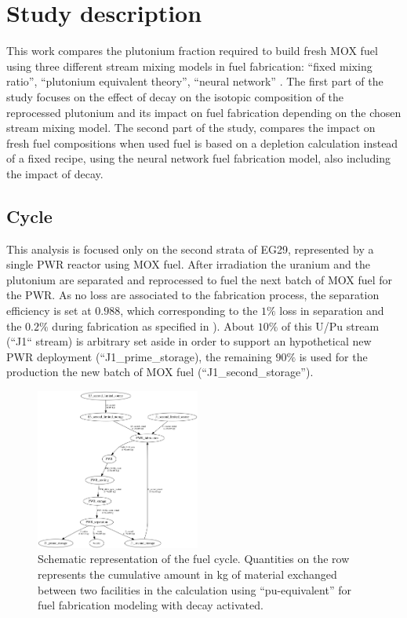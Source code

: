 \documentclass{anstrans}
\begin{document}
\section{Study description}

This work compares the plutonium fraction required to build fresh MOX fuel
using three different stream mixing models in fuel fabrication: ``fixed mixing
ratio'', ``plutonium equivalent theory'', ``neural network'' \cite{Leniau2015125}.
The first part of the study focuses on the effect of decay on the isotopic
composition of the reprocessed plutonium and its impact on fuel fabrication
depending on the chosen stream mixing model.  The second part of the study,
compares the impact on fresh fuel compositions when used fuel is based on a
depletion calculation instead of a fixed recipe, using the neural network fuel
fabrication model, also including the impact of decay.


\subsection{Cycle}

This analysis is focused only on the second strata of EG29, represented by a
single PWR reactor using MOX fuel. After irradiation the uranium and the
plutonium are separated and reprocessed to fuel the next batch of MOX fuel for
the PWR. As no loss are associated to the fabrication process, the separation
efficiency is set at $0.988$, which corresponding to the $1\%$ loss in
separation and the $0.2\%$ during fabrication as specified in \cite{FCDP}).
About $10\%$ of this U/Pu stream (``J1`` stream) is arbitrary set aside in order
to support an hypothetical new PWR deployment (``J1\_prime\_storage), the
remaining $90\%$ is used for the production the new batch of MOX fuel
(``J1\_second\_storage'').

\begin{figure}[ht] %
  \centering
  \includegraphics[width=0.48\textwidth]{flow}
  \caption{Schematic representation of the fuel cycle. Quantities on the row
  represents the cumulative amount in kg of material exchanged between two
  facilities in the calculation using ``pu-equivalent'' for fuel fabrication
  modeling with decay activated.}
  \label{fig:flow}
\end{figure}
\end{document}

